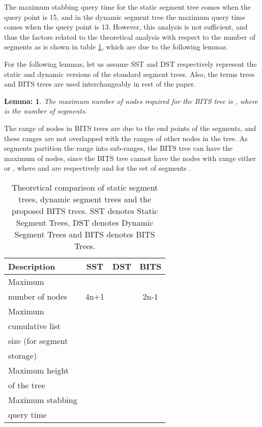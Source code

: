 \documentclass{article}
\newtheorem{lemma}{Lemma:}
\newenvironment{proof}{{\bf Proof:}}{\hfill {\fbox{}}}
\begin{document}
The maximum stabbing query time for the static segment tree comes when the query point is 15, and in the dynamic segment tree the maximum query time comes when the query point is 13. However, this analysis is not sufficient, and thus the factors related to the theoretical analysis  with respect to the number of segments as  is shown in table \ref{t2}, which are due to the following lemmas.
\par
For the following lemmas, let us assume SST and DST respectively represent the static and dynamic versions of the standard segment trees. Also, the terms trees and BITS trees are used interchangeably in rest of the paper.
\begin{lemma}
\label{l1}
The maximum number of nodes required for the BITS tree is , where  is the number of segments.
\end{lemma}
\begin{proof}
The range of nodes in BITS trees are due to the end points of the segments, and these ranges are not overlapped with the ranges of other nodes in the tree. As  segments partition the range  into  sub-ranges, the BITS tree can have the maximum of  nodes, since the BITS tree cannot have the nodes with range either  or , where  and  are respectively  and  for the set of segments .
\end{proof}
\begin{table}[!ht]
\caption{Theoretical comparison of static segment trees, dynamic segment trees and the proposed BITS trees. SST denotes Static Segment Trees, DST denotes Dynamic Segment Trees and BITS denotes BITS Trees.}
\label{t2}
\vspace{3mm}
\footnotesize
\begin{center}
\begin{tabular}{|l|c|c|c|}
\hline
Description & SST & DST & BITS\\
\hline
Maximum&&&\\
number of nodes &4n+1&&2n-1\\
\hline
Maximum &&&\\
cumulative list &&&\\
size (for segment &&&\\
storage)&&&\\
\hline
Maximum height&&&\\
of the tree &&&\\
\hline
Maximum stabbing&&&\\
query time&&&\\
\hline
\end{tabular}
\end{center}
\normalsize
\end{table}
\end{document}
